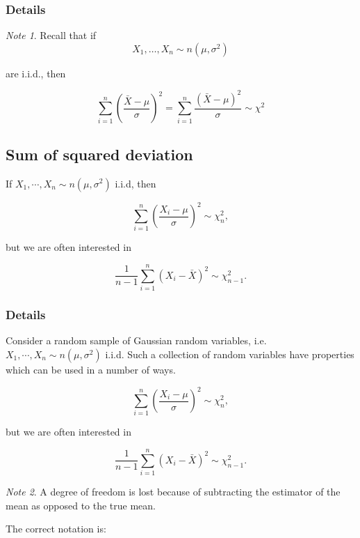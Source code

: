 \documentclass[12pt,a4paper]{article}
\theoremstyle{regla}
\theoremstyle{remark}
\newtheorem{notes}{Note}[section]
\theoremstyle{definition}
\theoremstyle{nonumberbreak}
\begin{document}
\subsubsection{Details}
\begin{notes}
Recall that if 
$$ X_1, \ldots, X_n \sim n (\mu, \sigma^2)$$

 
are i.i.d., then 

$$\sum_{i=1}^n \left ( \frac {\bar{X} - \mu} {\sigma}\right ) ^2= \sum_{i=1}^n \frac {\left ( \bar{X} - \mu\right ) ^2} {\sigma}\sim \chi^2 $$
\end{notes}

\subsection{Sum of squared deviation}
\begin{fbox}
\begin{minipage}{0.97\textwidth}
If $X_1,\cdots,X_n \sim n(\mu,\sigma^2)$ i.i.d, then



$$\sum_{i=1}^n \left ( \frac{X_i-\mu}{\sigma} \right )^2 \sim \chi_{n}^2,$$

 but we are often interested in

$$\frac{1}{n-1}\sum_{i=1}^n (X_i-\bar{X})^2\sim \chi_{n-1}^2.$$

 

\end{minipage}
\end{fbox}
\subsubsection{Details}
Consider a random sample of Gaussian random variables, i.e. $X_1,\cdots,X_n \sim n(\mu,\sigma^2)$ i.i.d. Such a collection of random variables have properties which can be used in a number of ways.



$$\sum_{i=1}^n \left ( \frac{X_i-\mu}{\sigma} \right )^2 \sim \chi_{n}^2,$$

 but we are often interested in

$$\frac{1}{n-1}\sum_{i=1}^n (X_i-\bar{X})^2\sim \chi_{n-1}^2.$$

 

\begin{notes}
A degree of freedom is lost because of subtracting the estimator of the mean as opposed to the true mean. 
\end{notes}
The correct notation is:
\end{document}
